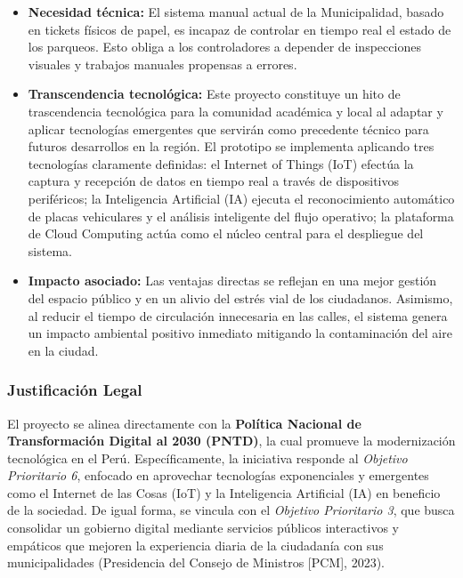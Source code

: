 \documentclass[12pt,a4paper]{article}
\begin{document}
\begin{itemize}[leftmargin=*]
	\item \textbf{Necesidad técnica:} El sistema manual actual de la Municipalidad, basado en tickets físicos de papel, es incapaz de controlar en tiempo real el estado de los parqueos. Esto obliga a los controladores a depender de inspecciones visuales y trabajos manuales propensas a errores.
	
	\item \textbf{Transcendencia tecnológica:} Este proyecto constituye un hito de trascendencia tecnológica para la comunidad académica y local al adaptar y aplicar tecnologías emergentes que servirán como precedente técnico para futuros desarrollos en la región. El prototipo se implementa aplicando tres tecnologías claramente definidas: el Internet of Things (IoT) efectúa la captura y recepción de datos en tiempo real a través de dispositivos periféricos; la Inteligencia Artificial (IA) ejecuta el reconocimiento automático de placas vehiculares y el análisis inteligente del flujo operativo; la plataforma de Cloud Computing actúa como el núcleo central para el despliegue del sistema.
	
	\item \textbf{Impacto asociado:} Las ventajas directas se reflejan en una mejor gestión del espacio público y en un alivio del estrés vial de los ciudadanos. Asimismo, al reducir el tiempo de circulación innecesaria en las calles, el sistema genera un impacto ambiental positivo inmediato  mitigando la contaminación del aire en la ciudad.
\end{itemize}

\subsubsection{Justificación Legal}

El proyecto se alinea directamente con la \textbf{Política Nacional de Transformación Digital al 2030 (PNTD)}, la cual promueve la modernización tecnológica en el Perú. Específicamente, la iniciativa responde al \textit{Objetivo Prioritario 6}, enfocado en aprovechar tecnologías exponenciales y emergentes como el Internet de las Cosas (IoT) y la Inteligencia Artificial (IA) en beneficio de la sociedad. De igual forma, se vincula con el \textit{Objetivo Prioritario 3}, que busca consolidar un gobierno digital mediante servicios públicos interactivos y empáticos que mejoren la experiencia diaria de la ciudadanía con sus municipalidades (Presidencia del Consejo de Ministros [PCM], 2023).
\end{document}
